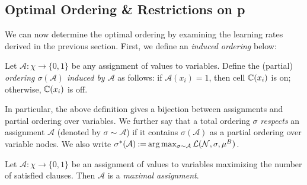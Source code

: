 \subsection{Optimal Ordering \& Restrictions on p}
\label{ssec:assignment_bayes}
We can now determine the optimal ordering by examining the learning rates derived in the previous section. First, we define an \emph{induced ordering} below:

\begin{definition}
    Let $\mathcal{A}: \chi \to \{0,1\}$ be any assignment of values to variables. Define the (partial) \emph{ordering $\sigma(\mathcal{A})$ induced by $\mathcal{A}$} as follows: if $\mathcal{A}(x_i)=1$, then cell $\mathbb{C}\!\left(x_i\right)$ is on; otherwise, $\mathbb{C}\!\left(x_i\right)$ is off.
\end{definition}

In particular, the above definition gives a bijection between assignments and partial ordering over variables. We further say that a total ordering $\sigma$ \emph{respects} an assignment $\mathcal{A}$ (denoted by $\sigma \sim \mathcal{A}$) if it contains $\sigma(\mathcal{A})$ as a partial ordering over variable nodes. We also write $\sigma^*(\mathcal{A}) \mathbin{:=} \arg\max_{\sigma \sim \mathcal{A}} \mathcal{L}(\mathcal{N}, \sigma, \mu^B)$.

\begin{definition} \label{def:max_assignment}
    Let $\mathcal{A}: \chi \to \{0,1\}$ be an assignment of values to variables maximizing the number of satisfied clauses. Then $\mathcal{A}$ is a \emph{maximal assignment}.
\end{definition}

